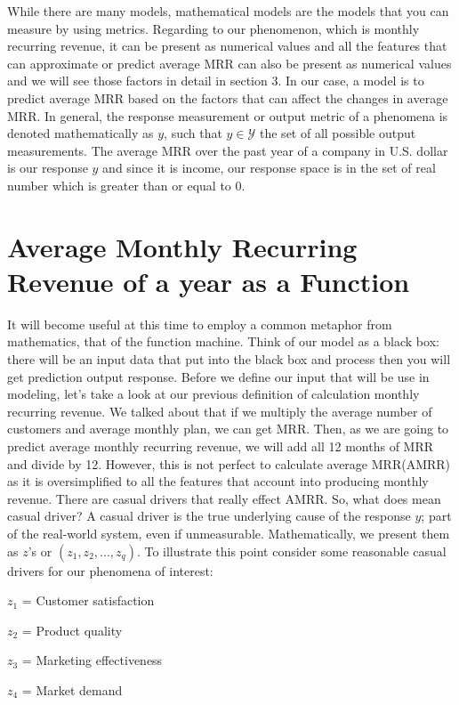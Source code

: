 \documentclass[12pt]{article}
\begin{document}
While there are many models, mathematical models are the models that you can measure by using metrics. Regarding to our phenomenon, which is monthly recurring revenue, it can be present as numerical values and all the features that can approximate or predict average MRR can also be present as numerical values and we will see those factors in detail in section 3. In our case, a model is to predict average MRR based on the factors that can affect the changes in average MRR. In general, the response measurement or output metric of a phenomena is denoted mathematically as $y$, such that $y \in \mathcal{Y}$ the set of all possible output measurements. The average MRR over the past year of a company in U.S. dollar is our response $y$ and since it is income, our response space is in the set of real number which is greater than or equal to 0. 

\section{Average Monthly Recurring Revenue of a year as a Function}

It will become useful at this time to employ a common metaphor from mathematics, that of the function machine. Think of our model as a black box: there will be an input data that put into the black box and process then you will get prediction output response. Before we define our input that will be use in modeling, let's take a look at our previous definition of calculation monthly recurring revenue. We talked about that if we multiply the average number of customers and average monthly plan, we can get MRR. Then, as we are going to predict average monthly recurring revenue, we will add all 12 months of MRR and divide by 12. However, this is not perfect to calculate average MRR(AMRR) as it is oversimplified to all the features that account into producing monthly revenue. There are casual drivers that really effect AMRR. So, what does mean casual driver? A casual driver is the true underlying cause of the response $y$; part of the real-world system, even if unmeasurable. Mathematically, we present them as $z$'s or $(z_1, z_2, \dots , z_q)$. To illustrate this point consider some reasonable casual drivers for our phenomena of interest:

$z_1$ = Customer satisfaction

$z_2$ = Product quality

$z_3$ = Marketing effectiveness

$z_4$ = Market demand
\end{document}
